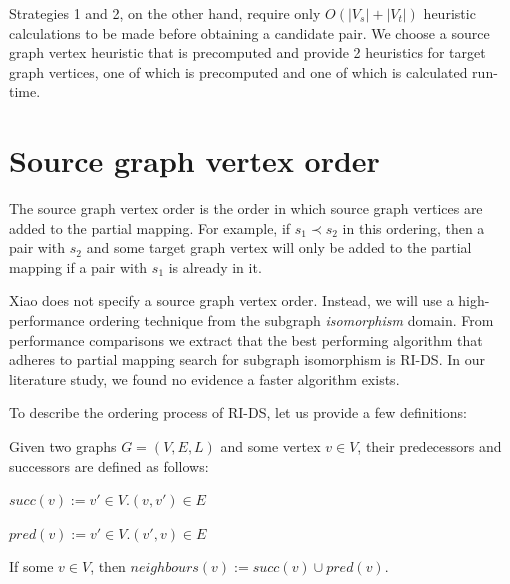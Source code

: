 Strategies 1 and 2, on the other hand, require only $O(|V_s|+|V_t|)$ heuristic calculations to be made before obtaining a candidate pair. We choose a source graph vertex heuristic that is precomputed and provide 2 heuristics for target graph vertices, one of which is precomputed and one of which is calculated run-time.

\section{Source graph vertex order}
\label{sec:sourceOrder}
The source graph vertex order is the order in which source graph vertices are added to the partial mapping. For example, if $s_1 \prec s_2$ in this ordering, then a pair with $s_2$ and some target graph vertex will only be added to the partial mapping if a pair with $s_1$ is already in it.

Xiao does not specify a source graph vertex order. Instead, we will use a high-performance ordering technique from the subgraph \textit{isomorphism} domain. From performance comparisons we extract that the best performing algorithm that adheres to partial mapping search for subgraph isomorphism is RI-DS. In our literature study, we found no evidence a faster algorithm exists. 

To describe the ordering process of RI-DS, let us provide a few definitions:

\begin{defn}
Given two graphs $G=(V, E, L)$ and some vertex $v \in V$, their predecessors and successors are defined as follows:

$\mathit{succ}(v) := {v' \in V . (v, v') \in E}$

$\mathit{pred}(v) := {v' \in V . (v', v) \in E}$
 
\end{defn}

\begin{defn}
If some $v\in V$, then $\mathit{neighbours}(v):= \mathit{succ}(v) \cup \mathit{pred}(v)$.
\end{defn}



